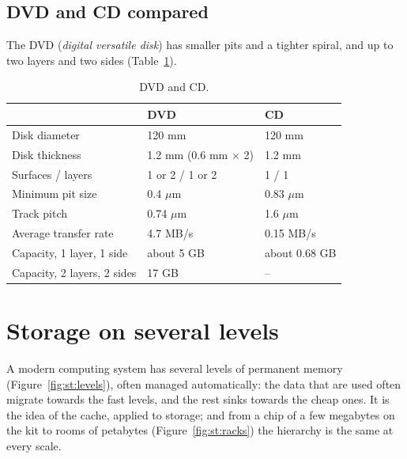 \subsection{DVD and CD compared}

The DVD (\emph{digital versatile disk}) has smaller pits and a tighter spiral,
and up to two layers and two sides (Table~\ref{tab:st:dvd}).

\begin{table}[htb]
\centering\small
\caption{DVD and CD.}\label{tab:st:dvd}
\begin{tabular}{@{}lll@{}}
\toprule
 & \textbf{DVD} & \textbf{CD}\\
\midrule
Disk diameter & 120 mm & 120 mm\\
Disk thickness & 1.2 mm ($0.6$ mm $\times$ 2) & 1.2 mm\\
Surfaces / layers & 1 or 2 / 1 or 2 & 1 / 1\\
Minimum pit size & 0.4 $\mu$m & 0.83 $\mu$m\\
Track pitch & 0.74 $\mu$m & 1.6 $\mu$m\\
Average transfer rate & 4.7 MB/s & 0.15 MB/s\\
Capacity, 1 layer, 1 side & about 5 GB & about 0.68 GB\\
Capacity, 2 layers, 2 sides & 17 GB & --\\
\bottomrule
\end{tabular}
\end{table}

\section{Storage on several levels}

A modern computing system has several levels of permanent memory
(Figure~\ref{fig:st:levels}), often managed automatically: the data that are
used often migrate towards the fast levels, and the rest sinks towards the
cheap ones. It is the idea of the cache, applied to storage; and from a chip
of a few megabytes on the kit to rooms of petabytes
(Figure~\ref{fig:st:racks}) the hierarchy is the same at every scale.

